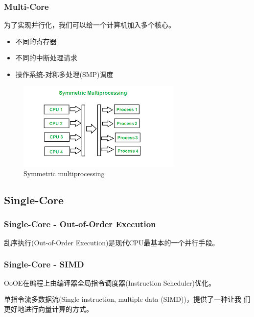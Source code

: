\documentclass[aspectratio=169]{ctexbeamer}
\begin{document}
\begin{frame}
    \frametitle{Multi-Core}

    为了实现并行化，我们可以给一个计算机加入多个核心。

    \begin{itemize}
        \item 不同的寄存器
        \item 不同的中断处理请求
        \item 操作系统-对称多处理(SMP)调度
    \end{itemize}

    \begin{figure}[h]
        \includegraphics[height=0.45\textheight]{images/smp.png}
        \caption{Symmetric multiprocessing}
    \end{figure}

\end{frame}

\subsection{Single-Core}

\begin{frame}
    \frametitle{Single-Core - Out-of-Order Execution}

    乱序执行(Out-of-Order Execution)是现代CPU最基本的一个并行手段。


\end{frame}

\begin{frame}
    \frametitle{Single-Core - SIMD}

    OoOE在编程上由编译器全局指令调度器(Instruction Scheduler)优化。

    单指令流多数据流(Single instruction, multiple data (SIMD))，提供了一种让我
    们更好地进行向量计算的方式。


\end{frame}
\end{document}
